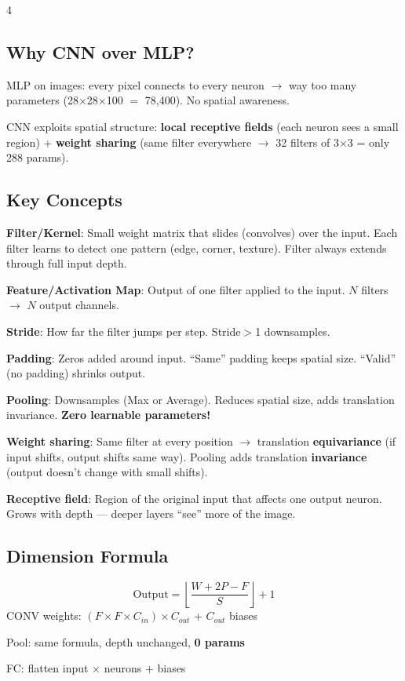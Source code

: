 \documentclass[6pt,landscape,a4paper]{extarticle}
\begin{document}
\begin{multicols}{4}
\subsection{Why CNN over MLP?}
MLP on images: every pixel connects to every neuron $\to$ way too many parameters (28$\times$28$\times$100 $=$ 78,400). No spatial awareness.

CNN exploits spatial structure: \textbf{local receptive fields} (each neuron sees a small region) + \textbf{weight sharing} (same filter everywhere $\to$ 32 filters of 3$\times$3 = only 288 params).

\subsection{Key Concepts}
\textbf{Filter/Kernel}: Small weight matrix that slides (convolves) over the input. Each filter learns to detect one pattern (edge, corner, texture). Filter always extends through full input depth.

\textbf{Feature/Activation Map}: Output of one filter applied to the input. $N$ filters $\to$ $N$ output channels.

\textbf{Stride}: How far the filter jumps per step. Stride$>$1 downsamples.

\textbf{Padding}: Zeros added around input. ``Same'' padding keeps spatial size. ``Valid'' (no padding) shrinks output.

\textbf{Pooling}: Downsamples (Max or Average). Reduces spatial size, adds translation invariance. \textbf{Zero learnable parameters!}

\textbf{Weight sharing}: Same filter at every position $\to$ translation \textbf{equivariance} (if input shifts, output shifts same way). Pooling adds translation \textbf{invariance} (output doesn't change with small shifts).

\textbf{Receptive field}: Region of the original input that affects one output neuron. Grows with depth --- deeper layers ``see'' more of the image.

\subsection{Dimension Formula}
\[\boxed{\text{Output} = \left\lfloor\frac{W + 2P - F}{S}\right\rfloor + 1}\]
CONV weights: $(F \!\times\! F \!\times\! C_{in}) \times C_{out}$ + $C_{out}$ biases

Pool: same formula, depth unchanged, \textbf{0 params}

FC: flatten input $\times$ neurons + biases


\end{multicols}
\end{document}
